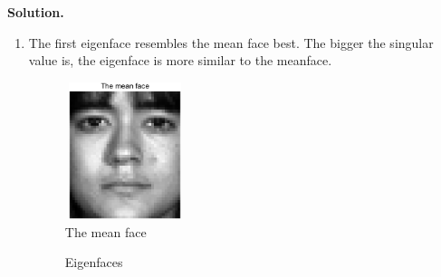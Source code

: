 \documentclass[english,onecolumn]{IEEEtran}
\begin{document}
\noindent
\textbf{Solution.}
\begin{enumerate}	
	\newpage
	\item The first eigenface resembles the mean face best. The bigger the singular value is, the eigenface is more similar to the meanface.
	\begin{figure}[h]
		\centering
		\includegraphics[height=4cm,width=3.5cm]{pro4_1_1.png}
		\caption{The mean face}
		\label{5}
	\end{figure}

	\begin{figure}[htbp]
		\centering
		\quad
		\quad
		\quad
		\caption{ Eigenfaces}
	\end{figure}


\end{enumerate}
\end{document}
